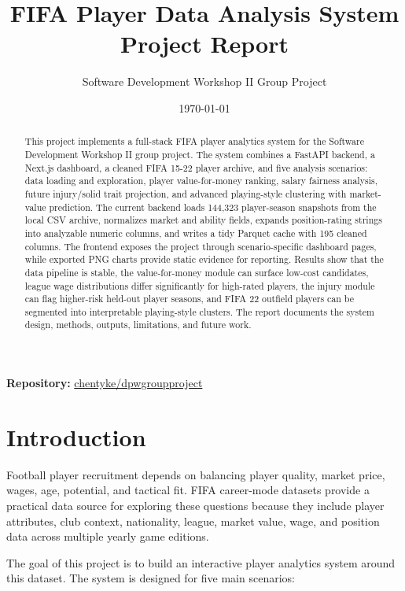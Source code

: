 \documentclass[11pt,a4paper]{article}
\title{FIFA Player Data Analysis System Project Report}
\author{Software Development Workshop II Group Project}
\date{\today}
\begin{document}
\maketitle

\begin{center}
\textbf{Repository:} \href{https://github.com/chentyke/dpwgroupproject}{chentyke/dpwgroupproject}
\end{center}

\begin{abstract}
This project implements a full-stack FIFA player analytics system for the Software Development Workshop II group project. The system combines a FastAPI backend, a Next.js dashboard, a cleaned FIFA 15-22 player archive, and five analysis scenarios: data loading and exploration, player value-for-money ranking, salary fairness analysis, future injury/solid trait projection, and advanced playing-style clustering with market-value prediction. The current backend loads 144,323 player-season snapshots from the local CSV archive, normalizes market and ability fields, expands position-rating strings into analyzable numeric columns, and writes a tidy Parquet cache with 195 cleaned columns. The frontend exposes the project through scenario-specific dashboard pages, while exported PNG charts provide static evidence for reporting. Results show that the data pipeline is stable, the value-for-money module can surface low-cost candidates, league wage distributions differ significantly for high-rated players, the injury module can flag higher-risk held-out player seasons, and FIFA 22 outfield players can be segmented into interpretable playing-style clusters. The report documents the system design, methods, outputs, limitations, and future work.
\end{abstract}

\section{Introduction}

Football player recruitment depends on balancing player quality, market price, wages, age, potential, and tactical fit. FIFA career-mode datasets provide a practical data source for exploring these questions because they include player attributes, club context, nationality, league, market value, wage, and position data across multiple yearly game editions.

The goal of this project is to build an interactive player analytics system around this dataset. The system is designed for five main scenarios:
\end{document}

